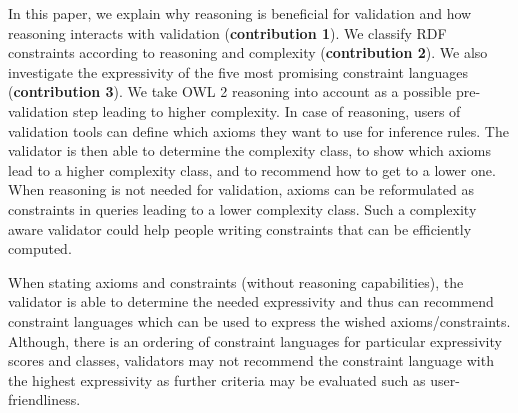 \documentclass{llncs}
\begin{document}

In this paper, we explain why reasoning is beneficial for validation and how reasoning interacts with validation (\textbf{contribution 1}).
We classify RDF constraints according to reasoning and complexity (\textbf{contribution 2}).
We also investigate the expressivity of the five most promising constraint languages (\textbf{contribution 3}).
We take OWL 2 reasoning into account as a possible pre-validation step leading to higher complexity.
In case of reasoning, users of validation tools can define which axioms they want to use for inference rules.
The validator is then able to determine the complexity class, to show which axioms lead to a higher complexity class, and to recommend how to get to a lower one.
When reasoning is not needed for validation, axioms can be reformulated as constraints in queries leading to a lower complexity class. 
Such a complexity aware validator could help people writing constraints that can be efficiently computed.

When stating axioms and constraints (without reasoning capabilities), 
the validator is able to determine the needed expressivity and thus can recommend constraint languages which can be used to express the wished axioms/constraints. 
Although, there is an ordering of constraint languages for particular expressivity scores and classes, 
validators may not recommend the constraint language with the highest expressivity as further criteria may be evaluated such as user-friendliness.

\end{document}
